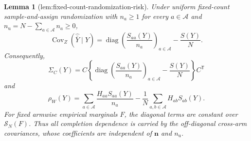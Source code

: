 \documentclass{article}
\newtheorem{lemma}{Lemma}
\begin{document}
\begin{lemma}[lem:fixed-count-randomization-risk]\label{lem:fixed-count-randomization-risk}
Under uniform fixed-count sample-and-assign randomization with \(n_a\geq1\) for every \(a\in\mathcal A\) and \(n_{\mathrm u}=N-\sum_{a\in\mathcal A}n_a\geq0\),
\[
\operatorname{Cov}_Z(\widehat{\bar Y}\mid Y)
=\operatorname{diag}\left(\frac{S_{aa}(Y)}{n_a}\right)_{a\in\mathcal A}-\frac{S(Y)}{N}.
\]
Consequently,
\[
\Sigma_C(Y)=C\left\{\operatorname{diag}\left(\frac{S_{aa}(Y)}{n_a}\right)_{a\in\mathcal A}-\frac{S(Y)}{N}\right\}C^{\mathsf T}
\]
and
\[
\rho_W(Y)=\sum_{a\in\mathcal A}\frac{H_{aa}S_{aa}(Y)}{n_a}
-\frac1N\sum_{a,b\in\mathcal A}H_{ab}S_{ab}(Y).
\]
For fixed armwise empirical marginals \(F\), the diagonal terms are constant over \(\mathcal S_N(F)\). Thus all completion dependence is carried by the off-diagonal cross-arm covariances, whose coefficients are independent of \(\mathbf n\) and \(n_{\mathrm u}\).
\end{lemma}
\end{document}
